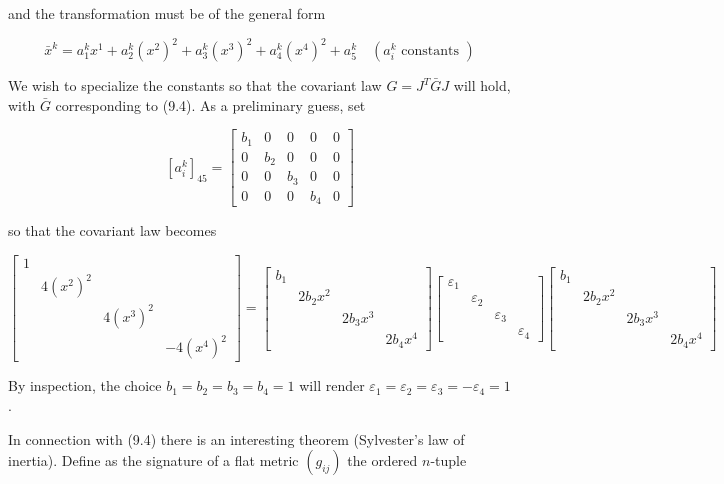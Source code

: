 \documentclass[10pt]{article}
\begin{document}
and the transformation must be of the general form

$$
\bar{x}^{k}=a_{1}^{k} x^{1}+a_{2}^{k}\left(x^{2}\right)^{2}+a_{3}^{k}\left(x^{3}\right)^{2}+a_{4}^{k}\left(x^{4}\right)^{2}+a_{5}^{k} \quad\left(a_{i}^{k} \text { constants }\right)
$$

We wish to specialize the constants so that the covariant law $G=J^{T} \bar{G} J$ will hold, with $\bar{G}$ corresponding to (9.4). As a preliminary guess, set

$$
\left[a_{i}^{k}\right]_{45}=\left[\begin{array}{ccccc}
b_{1} & 0 & 0 & 0 & 0 \\
0 & b_{2} & 0 & 0 & 0 \\
0 & 0 & b_{3} & 0 & 0 \\
0 & 0 & 0 & b_{4} & 0
\end{array}\right]
$$

so that the covariant law becomes

$$
\left[\begin{array}{llll}
1 & & & \\
& 4\left(x^{2}\right)^{2} & & \\
& & 4\left(x^{3}\right)^{2} & \\
& & & -4\left(x^{4}\right)^{2}
\end{array}\right]=\left[\begin{array}{llll}
b_{1} & & & \\
& 2 b_{2} x^{2} & & \\
& & 2 b_{3} x^{3} & \\
& & & 2 b_{4} x^{4}
\end{array}\right]\left[\begin{array}{llll}
\varepsilon_{1} & & & \\
& \varepsilon_{2} & & \\
& & \varepsilon_{3} & \\
& & & \varepsilon_{4}
\end{array}\right]\left[\begin{array}{llll}
b_{1} & & \\
& 2 b_{2} x^{2} & & \\
& & 2 b_{3} x^{3} & \\
& & & 2 b_{4} x^{4}
\end{array}\right]
$$

By inspection, the choice $b_{1}=b_{2}=b_{3}=b_{4}=1$ will render $\varepsilon_{1}=\varepsilon_{2}=\varepsilon_{3}=-\varepsilon_{4}=1$.

In connection with (9.4) there is an interesting theorem (Sylvester's law of inertia). Define as the signature of a flat metric $\left(g_{i j}\right)$ the ordered $n$-tuple
\end{document}
